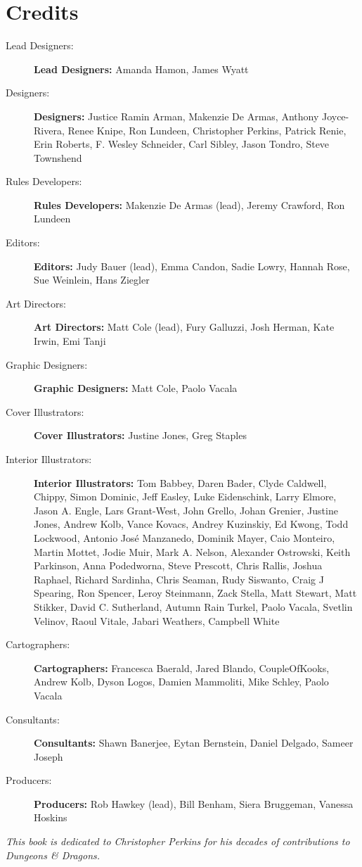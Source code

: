 \documentclass[letterpaper, 11pt, twocolumn]{dndbook}
\begin{document}





\chapter{Credits}\label{ch:credits-3-3}

\begin{description}
\item[Lead Designers:] \textbf{Lead Designers:} Amanda Hamon, James Wyatt
\item[Designers:] \textbf{Designers:} Justice Ramin Arman, Makenzie De Armas, Anthony Joyce-Rivera, Renee Knipe, Ron Lundeen, Christopher Perkins, Patrick Renie, Erin Roberts, F. Wesley Schneider, Carl Sibley, Jason Tondro, Steve Townshend
\item[Rules Developers:] \textbf{Rules Developers:} Makenzie De Armas (lead), Jeremy Crawford, Ron Lundeen
\item[Editors:] \textbf{Editors:} Judy Bauer (lead), Emma Candon, Sadie Lowry, Hannah Rose, Sue Weinlein, Hans Ziegler
\item[Art Directors:] \textbf{Art Directors:} Matt Cole (lead), Fury Galluzzi, Josh Herman, Kate Irwin, Emi Tanji
\item[Graphic Designers:] \textbf{Graphic Designers:} Matt Cole, Paolo Vacala
\item[Cover Illustrators:] \textbf{Cover Illustrators:} Justine Jones, Greg Staples
\item[Interior Illustrators:] \textbf{Interior Illustrators:} Tom Babbey, Daren Bader, Clyde Caldwell, Chippy, Simon Dominic, Jeff Easley, Luke Eidenschink, Larry Elmore, Jason A. Engle, Lars Grant-West, John Grello, Johan Grenier, Justine Jones, Andrew Kolb, Vance Kovacs, Andrey Kuzinskiy, Ed Kwong, Todd Lockwood, Antonio José Manzanedo, Dominik Mayer, Caio Monteiro, Martin Mottet, Jodie Muir, Mark A. Nelson, Alexander Ostrowski, Keith Parkinson, Anna Podedworna, Steve Prescott, Chris Rallis, Joshua Raphael, Richard Sardinha, Chris Seaman, Rudy Siswanto, Craig J Spearing, Ron Spencer, Leroy Steinmann, Zack Stella, Matt Stewart, Matt Stikker, David C. Sutherland, Autumn Rain Turkel, Paolo Vacala, Svetlin Velinov, Raoul Vitale, Jabari Weathers, Campbell White
\item[Cartographers:] \textbf{Cartographers:} Francesca Baerald, Jared Blando, CoupleOfKooks, Andrew Kolb, Dyson Logos, Damien Mammoliti, Mike Schley, Paolo Vacala
\item[Consultants:] \textbf{Consultants:} Shawn Banerjee, Eytan Bernstein, Daniel Delgado, Sameer Joseph
\item[Producers:] \textbf{Producers:} Rob Hawkey (lead), Bill Benham, Siera Bruggeman, Vanessa Hoskins
\end{description}
\textit{This book is dedicated to Christopher Perkins for his decades of contributions to Dungeons \& Dragons.}
\end{document}
